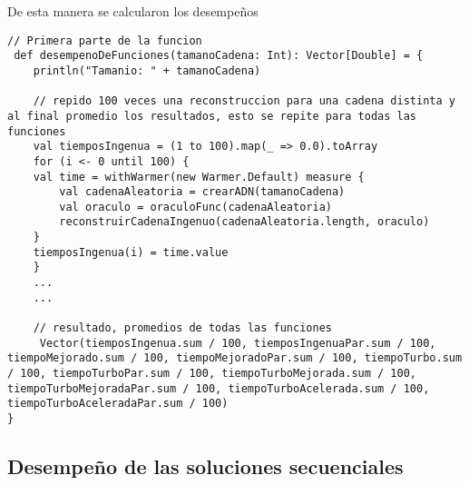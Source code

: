 \documentclass[conference]{IEEEtran}
\begin{document}

\newpage
De esta manera se calcularon los desempeños
\begin{lstlisting}
// Primera parte de la funcion
 def desempenoDeFunciones(tamanoCadena: Int): Vector[Double] = {
    println("Tamanio: " + tamanoCadena)

    // repido 100 veces una reconstruccion para una cadena distinta y al final promedio los resultados, esto se repite para todas las funciones
    val tiemposIngenua = (1 to 100).map(_ => 0.0).toArray
    for (i <- 0 until 100) {
    val time = withWarmer(new Warmer.Default) measure {
        val cadenaAleatoria = crearADN(tamanoCadena)
        val oraculo = oraculoFunc(cadenaAleatoria)
        reconstruirCadenaIngenuo(cadenaAleatoria.length, oraculo)
    }
    tiemposIngenua(i) = time.value
    }
    ...
    ...

    // resultado, promedios de todas las funciones
     Vector(tiemposIngenua.sum / 100, tiemposIngenuaPar.sum / 100, tiempoMejorado.sum / 100, tiempoMejoradoPar.sum / 100, tiempoTurbo.sum / 100, tiempoTurboPar.sum / 100, tiempoTurboMejorada.sum / 100, tiempoTurboMejoradaPar.sum / 100, tiempoTurboAcelerada.sum / 100, tiempoTurboAceleradaPar.sum / 100)
}
\end{lstlisting}


\subsection{\textbf{Desempeño de las soluciones secuenciales}}
\end{document}
